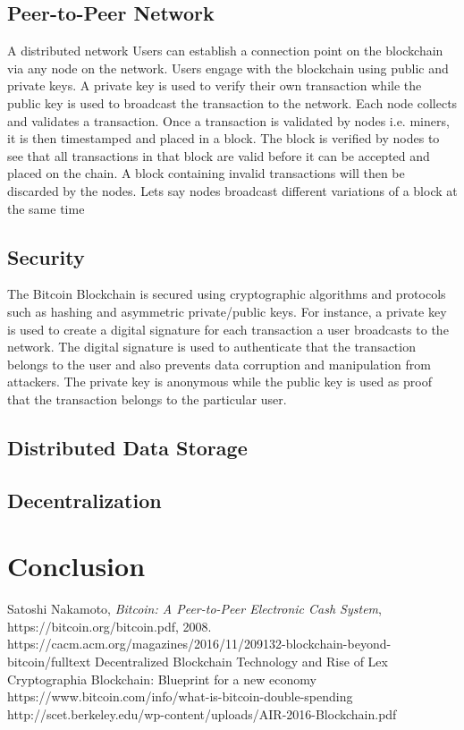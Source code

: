 \documentclass[report]{IEEEtran}
\begin{document}
\subsection{Peer-to-Peer Network}
A distributed network  Users can establish a connection point on the blockchain via any node on the network. Users engage with the blockchain using public and private keys. A private key is used to verify their own transaction while the public key is used to broadcast the transaction to the network. Each node collects and validates a transaction. Once a transaction is validated by nodes i.e. miners, it is then timestamped and placed in a block. The block is verified by nodes to see that all transactions in that block are valid before it can be accepted and placed on the chain. A block containing invalid transactions will then be discarded by the nodes. Lets say nodes broadcast different variations of a block at the same time
\subsection{Security}
The Bitcoin Blockchain is secured using cryptographic algorithms and protocols such as hashing and asymmetric private/public keys. For instance, a private key is used to create a digital signature for each transaction a user broadcasts to the network. The digital signature is used to authenticate that the transaction belongs to the user and also prevents data corruption and manipulation from attackers. The private key is anonymous while the public key is used as proof that the transaction belongs to the particular user. 
\subsection{Distributed Data Storage}
\subsection{Decentralization}
\section{Conclusion}

\begin{thebibliography}{1}

Satoshi Nakamoto, \emph{Bitcoin: A Peer-to-Peer Electronic Cash System}, https://bitcoin.org/bitcoin.pdf, 2008.
https://cacm.acm.org/magazines/2016/11/209132-blockchain-beyond-bitcoin/fulltext
\bibitem{}
Decentralized Blockchain Technology and Rise of Lex Cryptographia
\bibitem{}
Blockchain: Blueprint for a new economy
\bibitem{}
https://www.bitcoin.com/info/what-is-bitcoin-double-spending
\bibitem{}
http://scet.berkeley.edu/wp-content/uploads/AIR-2016-Blockchain.pdf

\end{thebibliography}
\end{document}
